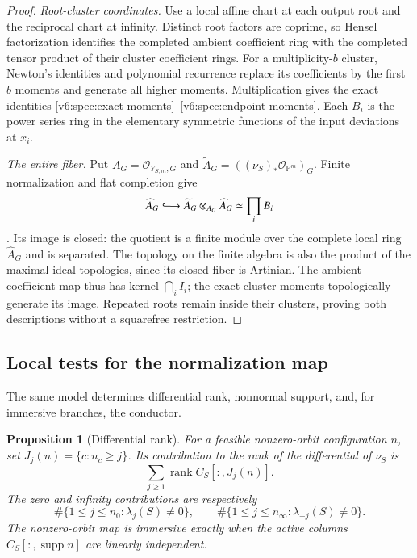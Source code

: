 \documentclass[10pt,fleqn]{article}
\numberwithin{equation}{section}
\newtheorem{proposition}[theorem]{Proposition}
\newcommand{\PP}{\mathbb P}
\newcommand{\rank}{\operatorname{rank}}
\begin{document}
\begin{proof}
\emph{Root-cluster coordinates.}
Use a local affine chart at each output root and the reciprocal chart at
infinity.  Distinct root factors are coprime, so Hensel factorization
identifies the completed ambient coefficient ring with the completed
tensor product of their cluster coefficient rings.  For a multiplicity-$b$ cluster, Newton's identities and polynomial
recurrence replace its coefficients by the first $b$ moments and
generate all higher moments.  Multiplication gives the exact identities
\eqref{v6:spec:exact-moments}--\eqref{v6:spec:endpoint-moments}.
Each $B_i$ is the power series ring in the elementary symmetric
functions of the input deviations at $x_i$.

\emph{The entire fiber.}
Put $A_G=\mathcal O_{Y_{S,m},G}$ and
$\widetilde A_G=((\nu_S)_*\mathcal O_{\PP^m})_G$.  Finite normalization
and flat completion give
\[
 \widehat A_G\lhook\joinrel\longrightarrow
 \widetilde A_G\otimes_{A_G}\widehat A_G
 \simeq\prod_i B_i
\]
\cite[Tags~00MA and~07N9]{Stacks}.  Its image is closed: the quotient
is a finite module over the complete local ring $\widehat A_G$ and
is separated.  The topology on the finite algebra is also the product
of the maximal-ideal topologies, since its closed fiber is Artinian.
The ambient coefficient map thus has kernel $\bigcap_i I_i$; the exact
cluster moments topologically generate its image.  Repeated roots
remain inside their clusters, proving both descriptions without a
squarefree restriction.
\end{proof}

\subsection{Local tests for the normalization map}
\label{r20:spec:local-tests}
The same model determines differential rank, nonnormal support,
and, for immersive branches, the conductor.

\begin{proposition}[Differential rank]\label{v6:spec:differential-rank}
For a feasible nonzero-orbit configuration $n$, set
$J_j(n)=\{c:n_c\ge j\}$.  Its contribution to the rank of the differential
of $\nu_S$ is
\begin{equation}\label{v6:spec:rank-formula}
 \sum_{j\ge1}\rank C_S[:,J_j(n)].
\end{equation}
The zero and infinity contributions are respectively
\begin{equation}\label{v6:spec:endpoint-ranks}
 \#\{1\le j\le n_0:\lambda_j(S)\ne0\},\qquad
 \#\{1\le j\le n_\infty:\lambda_{-j}(S)\ne0\}.
\end{equation}
The nonzero-orbit map is immersive exactly when the active columns
$C_S[:,\operatorname{supp}n]$ are linearly independent.
\end{proposition}
\end{document}
